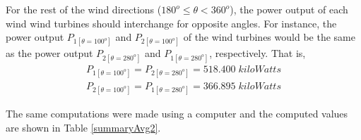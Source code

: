     For the rest of the wind directions ($180^o\leq \theta<360^o$), the power output of each wind wind turbines should interchange for opposite angles. For instance, the power output $P_{1[\theta=100^o]}$ and $P_{2[\theta=100^o]}$ of the wind turbines would be the same as the power output $P_{2[\theta=280^o]}$ and $P_{1[\theta=280^o]}$, respectively. That is,
    \begin{align*}
        P_{1[\theta=100^o]} = P_{2[\theta=280^o]} = 518.400\;kiloWatts \\
        P_{2[\theta=100^o]} = P_{1[\theta=280^o]} = 366.895\;kiloWatts
    \end{align*}
    
    The same computations were made using a computer and the computed values are shown in Table \ref{summaryAvg2}.
    
